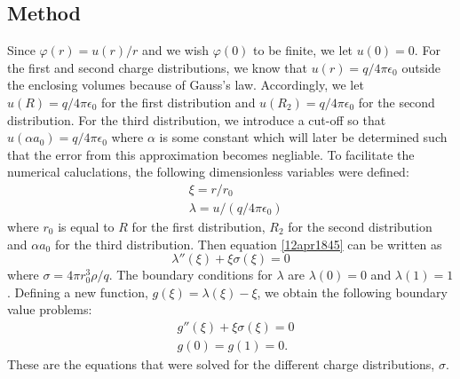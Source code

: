 \documentclass[twocolumn]{article}
\begin{document}
\begin{large}
\subsection*{Method}
Since $\varphi(r) = u(r)/r$ and we wish $\varphi(0)$ to be finite, we let $u(0) = 0$. For the first and second charge distributions, we know that $u(r) = q/4\pi\epsilon_0$ outside the enclosing volumes because of Gauss's law. Accordingly, we let $u(R) = q/4\pi\epsilon_0$ for the first distribution and $u(R_2) = q/4\pi\epsilon_0$ for the second distribution. For the third distribution, we introduce a cut-off so that $u(\alpha a_0) = q/4\pi\epsilon_0$ where $\alpha$ is some constant which will later be determined such that the error from this approximation becomes negliable. To facilitate the numerical caluclations, the following dimensionless variables were defined:
\begin{equation}
    \begin{split}
        &\xi = r/r_0 \\ 
        &\lambda = u/(q/4\pi\epsilon_0)
    \end{split}
\end{equation}
where $r_0$ is equal to $R$ for the first distribution, $R_2$ for the second distribution and $\alpha a_0$ for the third distribution. Then equation \eqref{12apr1845} can be written as
\begin{equation}
    \lambda''(\xi) + \xi\sigma(\xi) = 0
\end{equation}
where $\sigma = 4\pi r_0^3\rho/q$. The boundary conditions for $\lambda$ are $\lambda(0) = 0$ and $\lambda(1)=1$. Defining a new function, $g(\xi) = \lambda(\xi) - \xi$, we obtain the following boundary value problems:
\begin{equation}
    \begin{split}
        &g''(\xi) + \xi\sigma(\xi) = 0 \\ 
        &g(0) = g(1) = 0.
    \end{split}
\end{equation}
These are the equations that were solved for the different charge distributions, $\sigma$.


\end{large}
\end{document}
